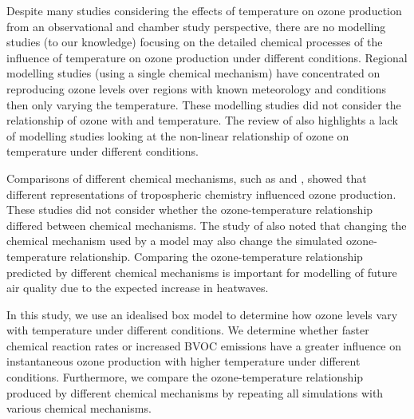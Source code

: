 Despite many studies considering the effects of temperature on ozone production from an observational and chamber study perspective, there are no modelling studies (to our knowledge) focusing on the detailed chemical processes of the influence of temperature on ozone production under different  conditions.
Regional modelling studies (using a single chemical mechanism) have concentrated on reproducing ozone levels over regions with known meteorology and  conditions then only varying the temperature.
These modelling studies did not consider the relationship of ozone with  and temperature.
The review of \citet{Pusede:2015} also highlights a lack of modelling studies looking at the non-linear relationship of ozone on temperature under different  conditions.

Comparisons of different chemical mechanisms, such as \citet{Emmerson:2009} and \citet{Coates:2015}, showed that different representations of tropospheric chemistry influenced ozone production.
These studies did not consider whether the ozone-temperature relationship differed between chemical mechanisms.
The study of \citet{Rasmussen:2013} also noted that changing the chemical mechanism used by a model may also change the simulated ozone-temperature relationship.
Comparing the ozone-temperature relationship predicted by different chemical mechanisms is important for modelling of future air quality due to the expected increase in heatwaves.

In this study, we use an idealised box model to determine how ozone levels vary with temperature under different  conditions.
We determine whether faster chemical reaction rates or increased BVOC emissions have a greater influence on instantaneous ozone production with higher temperature under different  conditions.
Furthermore, we compare the ozone-temperature relationship produced by different chemical mechanisms by repeating all simulations with various chemical mechanisms.
